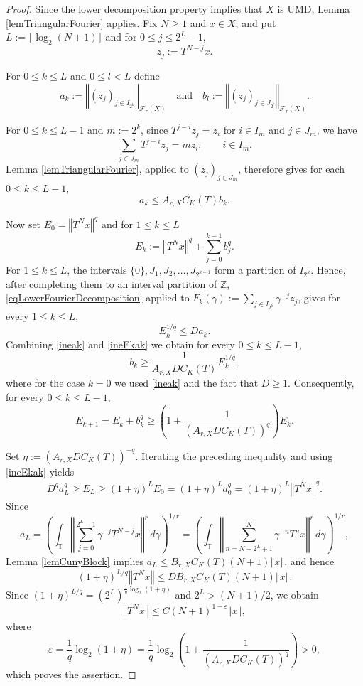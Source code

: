 \documentclass[10pt,a4paper]{amsart}
\newcommand{\T}{\mathbb{T}}
\newcommand{\Z}{\mathbb{Z}}
\newcommand{\norm}[1]{\left\Vert #1\right\Vert}
\begin{document}
	\begin{proof}
		Since the lower decomposition property implies that $X$ is UMD, Lemma
		\ref{lemTriangularFourier} applies. Fix $N\ge1$ and
		$x\in X$, and put $
		L:=\lfloor\log_2(N+1)\rfloor$ and for $0\le j\le2^L-1$, 
		\[
		z_j:=T^{N-j}x.
		\]
		
		For $0\le k\le L$ and $0\le l< L$ define 
		\[
		a_k
		:=
		\norm{(z_j)_{j\in I_{2^k}}}_{\mathcal F_r(X)}
		\quad \text{and} \quad 
		b_l
		:=
		\norm{(z_j)_{j\in J_{2^l}}}_{\mathcal F_r(X)}.
		\]
		
		For $0\le k\le L-1$ and $m:=2^k$, since
		$T^{j-i}z_j=z_i$ for $i\in I_m$ and $j\in J_m$, we have
		\[
		\sum_{j\in J_m}T^{j-i}z_j=mz_i,
		\qquad i\in I_m.
		\]
		Lemma \ref{lemTriangularFourier}, applied to
		$(z_j)_{j\in J_m}$, therefore gives for each $0\le k \le L-1 $,
		\begin{equation}\label{ineak}
			a_k\le A_{r,X}C_K(T) b_k.
		\end{equation}
		
		Now set $E_0 = \norm{T^Nx}^q$ and for $1 \le k \le L $
		\[
		E_k
		:=
		\norm{T^Nx}^q+\sum_{j=0}^{k-1}b_j^q.
		\]
		For $1\le k\le L$, the intervals $
		\{0\},J_1,J_2,\ldots,J_{2^{k-1}}
		$
		form a partition of $I_{2^k}$. Hence, after completing them to an interval
		partition of $\Z$, \eqref{eqLowerFourierDecomposition} applied to
		$
		F_k(\gamma)
		:=
		\sum_{j\in I_{2^k}}\gamma^{-j}z_j$,
		gives  for every $1\le k \le L$,
		\begin{equation}\label{ineEkak}
			E_k^{1/q}\le Da_k.
		\end{equation}
		Combining \eqref{ineak} and \eqref{ineEkak} 
		we obtain for every $0\le k \le L-1$, 
		\[
		b_k
		\ge
		\frac{1}{A_{r,X}DC_K(T)}E_k^{1/q},
		\]
		where for the case $k=0$ we used \eqref{ineak} and the fact that $D\ge 1$. Consequently, for every $0\le k \le L-1$,
		\[
		E_{k+1}
		=
		E_k+b_k^q
		\ge
		\left(
		1+\frac{1}{(A_{r,X}DC_K(T))^q}
		\right)E_k.
		\]
		
		Set $\eta:=(A_{r,X}DC_K(T))^{-q}$. Iterating the preceding inequality and using   \eqref{ineEkak} yields
		\begin{align*}
			D^qa_L^q \ge E_L
			\ge
			(1+\eta)^{L}E_0 
			=(1+\eta)^La_0^q =
			(1+\eta)^L\norm{T^Nx}^q.
		\end{align*}
		Since
		\[
		a_L
		=
		\left(
		\int_{\T}
		\norm{
			\sum_{j=0}^{2^L-1}\gamma^{-j}T^{N-j}x
		}^r\,d\gamma
		\right)^{1/r} = \left(
		\int_{\T}
		\norm{
			\sum_{n=N-2^L+1}^{N}\gamma^{-n}T^nx
		}^r\,d\gamma
		\right)^{1/r},
		\]
		Lemma \ref{lemCunyBlock} implies
		$a_L\le B_{r,X}C_K(T)(N+1)\norm{x}$, and hence
		\[
		(1+\eta)^{L/q}\norm{T^Nx}
		\le
		DB_{r,X}C_K(T)(N+1)\norm{x}.
		\]
		Since $
		(1+\eta)^{L/q}
		=
		(2^L)^{\frac1q\log_2(1+\eta)}$
		and $2^L>(N+1)/2$, we obtain
		\[
		\norm{T^Nx}
		\le
		C(N+1)^{1-\varepsilon}\norm{x},
		\]
		where
		\[
		\varepsilon
		=
		\frac1q\log_2(1+\eta)
		=
		\frac1q\log_2\left(
		1+\frac{1}{(A_{r,X}DC_K(T))^q}
		\right)>0,
		\]
		which proves the assertion.
	\end{proof}
\end{document}
